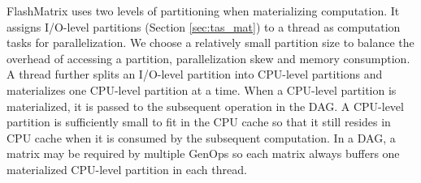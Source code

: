 
FlashMatrix uses two levels of partitioning when materializing computation.
It assigns I/O-level partitions (Section \ref{sec:tas_mat}) to a thread as
computation tasks for parallelization. We choose a relatively small partition
size to balance the overhead of accessing a partition, parallelization skew
and memory consumption. A thread further splits an I/O-level partition into
CPU-level partitions and materializes one CPU-level partition at a time.
When a CPU-level partition is materialized, it is passed to the subsequent
operation in the DAG. A CPU-level partition is sufficiently small to fit in
the CPU cache so that it still resides in CPU cache when it is consumed by
the subsequent computation. In a DAG, a matrix may be required by multiple
GenOps so each matrix always buffers one materialized CPU-level partition in
each thread. 




